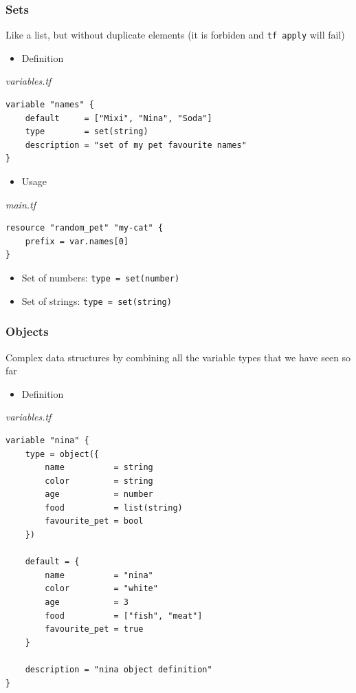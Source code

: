 \documentclass{article}
\newenvironment{codetemplate}[1][]{%
  \mybasecolorbox[#1]
  \itshape
}{%
  \endmybasecolorbox
}
\begin{document}
\subsubsection{Sets} 
Like a list, but without duplicate elements (it is forbiden and \verb+tf apply+ will fail)

\begin{itemize}
    \item Definition
\end{itemize}
\begin{codetemplate}{variables.tf}
\begin{verbatim}
variable "names" {
    default     = ["Mixi", "Nina", "Soda"]
    type        = set(string)
    description = "set of my pet favourite names"
}
\end{verbatim}
\end{codetemplate}
\begin{itemize}
    \item Usage
\end{itemize}
\begin{codetemplate}{main.tf}
\begin{verbatim}
resource "random_pet" "my-cat" {
    prefix = var.names[0]
}
\end{verbatim}
\end{codetemplate}
\begin{itemize}
    \item Set of numbers: \verb+type = set(number)+
    \item Set of strings: \verb+type = set(string)+
\end{itemize}

\subsubsection{Objects} 
Complex data structures by combining all the variable types that we have seen so far

\begin{itemize}
    \item Definition
\end{itemize}
\begin{codetemplate}{variables.tf}
\begin{verbatim}
variable "nina" {
    type = object({
        name          = string
        color         = string
        age           = number
        food          = list(string)
        favourite_pet = bool
    })

    default = {
        name          = "nina"
        color         = "white"
        age           = 3
        food          = ["fish", "meat"]
        favourite_pet = true
    }
    
    description = "nina object definition"
}
\end{verbatim}
\end{codetemplate}
\end{document}
